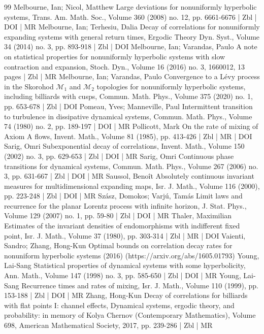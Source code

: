 \begin{thebibliography}{99}
Melbourne, Ian; Nicol, Matthew Large deviations for nonuniformly hyperbolic systems, Trans. Am. Math. Soc., Volume 360 (2008) no. 12, pp. 6661-6676 | Zbl | DOI | MR
Melbourne, Ian; Terhesiu, Dalia Decay of correlations for nonuniformly expanding systems with general return times, Ergodic Theory Dyn. Syst., Volume 34 (2014) no. 3, pp. 893-918 | Zbl | DOI
Melbourne, Ian; Varandas, Paulo A note on statistical properties for nonuniformly hyperbolic systems with slow contraction and expansion, Stoch. Dyn., Volume 16 (2016) no. 3, 1660012, 13 pages | Zbl | MR
Melbourne, Ian; Varandas, Paulo Convergence to a Lévy process in the Skorohod $\mathcal{M}_1$ and $\mathcal{M}_2$ topologies for nonuniformly hyperbolic systems, including billiards with cusps, Commun. Math. Phys., Volume 375 (2020) no. 1, pp. 653-678 | Zbl | DOI
Pomeau, Yves; Manneville, Paul Intermittent transition to turbulence in dissipative dynamical systems, Commun. Math. Phys., Volume 74 (1980) no. 2, pp. 189-197 | DOI | MR
Pollicott, Mark On the rate of mixing of Axiom A flows, Invent. Math., Volume 81 (1985), pp. 413-426 | Zbl | MR | DOI
Sarig, Omri Subexponential decay of correlations, Invent. Math., Volume 150 (2002) no. 3, pp. 629-653 | Zbl | DOI | MR
Sarig, Omri Continuous phase transitions for dynamical systems, Commun. Math. Phys., Volume 267 (2006) no. 3, pp. 631-667 | Zbl | DOI | MR
Saussol, Benoît Absolutely continuous invariant measures for multidimensional expanding maps, Isr. J. Math., Volume 116 (2000), pp. 223-248 | Zbl | DOI | MR
Szász, Domokos; Varjú, Tamás Limit laws and recurrence for the planar Lorentz process with infinite horizon, J. Stat. Phys., Volume 129 (2007) no. 1, pp. 59-80 | Zbl | DOI | MR
Thaler, Maximilian Estimates of the invariant densities of endomorphisms with indifferent fixed point, Isr. J. Math., Volume 37 (1980), pp. 303-314 | Zbl | MR | DOI
Vaienti, Sandro; Zhang, Hong-Kun Optimal bounds on correlation decay rates for nonuniform hyperbolic systems (2016) (https://arxiv.org/abs/1605.01793)
Young, Lai-Sang Statistical properties of dynamical systems with some hyperbolicity, Ann. Math., Volume 147 (1998) no. 3, pp. 585-650 | Zbl | DOI | MR
Young, Lai-Sang Recurrence times and rates of mixing, Isr. J. Math., Volume 110 (1999), pp. 153-188 | Zbl | DOI | MR
Zhang, Hong-Kun Decay of correlations for billiards with flat points I: channel effects, Dynamical systems, ergodic theory, and probability: in memory of Kolya Chernov (Contemporary Mathematics), Volume 698, American Mathematical Society, 2017, pp. 239-286 | Zbl | MR

\end{thebibliography}
